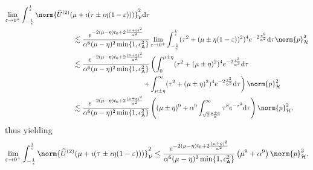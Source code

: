 \begin{equation}
\begin{aligned}
	\lim_{\varepsilon \rightarrow 0^+}
    \int_{-\frac{1}{\varepsilon}}^{\frac{1}{\varepsilon}}
    \norm{\widehat{U}^{(2)}(\mu + \imath (\tau  \pm \imath\eta(1-\varepsilon)))}^2_\mathcal{V}
    &
    \text{d}\tau
    \\
    &
    \hspace{-3.5cm}
    \lesssim
    \frac{e^{-2(\mu-\eta) t_0+2\frac{(\mu+\eta)^2}{\alpha^2}}}{\alpha^6(\mu-\eta)^2\min\{1, c^2_{\mathsf{A}}\}}
    \lim_{\varepsilon \rightarrow 0^+}
    \int_{-\frac{1}{\varepsilon}}^{\frac{1}{\varepsilon}}
    (\tau^2+(\mu\pm\eta(1-\varepsilon))^2)^4
	e^{-2\frac{\tau^2}{\alpha^2}}
    \text{d}\tau
	\norm{p}^2_\mathcal{H}
    \\
    &
    \hspace{-3.5cm}
    \lesssim
    \frac{e^{-2(\mu-\eta) t_0+2\frac{(\mu+\eta)^2}{\alpha^2}}}{\alpha^6(\mu-\eta)^2 \min\{1, c^2_{\mathsf{A}}\}}
    \left(
         \int_0^{\mu\pm\eta}
    		(\tau^2+(\mu\pm\eta)^2)^4
      	e^{-2\frac{\tau^2}{\alpha^2}}
         \text{d}\tau
     \right.
     \\
     &
     \left.
         +
         \int_{\mu\pm\eta}^{\infty}
    		(\tau^2+(\mu\pm\eta)^2)^4
      	e^{-2\frac{\tau^2}{\alpha^2}}
         \text{d}\tau
    \right)
    \norm{p}^2_\mathcal{H}
    \\
    &
    \hspace{-3.5cm}
    \lesssim
    \frac{e^{-2(\mu-\eta) t_0+2\frac{(\mu+\eta)^2}{\alpha^2}}}{\alpha^6(\mu-\eta)^2 \min\{1, c^2_{\mathsf{A}}\}}
    \left(
    		(\mu\pm\eta)^9
		+
		\alpha^9
         \int_{\sqrt{2} \frac{\mu\pm\eta}{\alpha}}^{\infty}
    		\tau^8
      	e^{-\tau^2}
         \text{d}\tau
    \right)
    \norm{p}^2_\mathcal{H},
\end{aligned}
\end{equation}
thus yielding
\begin{equation}
\begin{aligned}
	\lim_{\varepsilon \rightarrow 0^+}
    \int_{-\frac{1}{\varepsilon}}^{\frac{1}{\varepsilon}}
    \norm{\widehat{U}^{(2)}(\mu + \imath (\tau  \pm \imath\eta(1-\varepsilon)))}^2_\mathcal{V}
    \leq
    \frac{e^{-2(\mu-\eta) t_0+2\frac{(\mu+\eta)^2}{\alpha^2}}}{\alpha^6(\mu-\eta)^2 \min\{1, c^2_{\mathsf{A}}\}}
    \left(
    		\mu^9
		+
		\alpha^9
    \right)
    \norm{p}^2_\mathcal{H}.
\end{aligned}
\end{equation}

